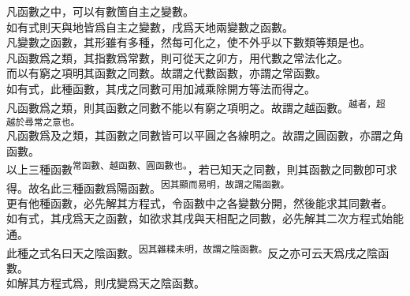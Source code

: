 \begin{enumerate} [label={第\chinese*款},nolistsep]
	凡函數之中，可以有數箇自主之變數。\\
	如有式\CJKmove 則天與地皆爲自主之變數，戌爲天地兩變數之函數。\\
	凡變數之函數，其形雖有多種，然每可化之，使不外乎以下數類\CJKmove 等類是也。\\
	凡函數爲\CJKmove 之類，其指數爲常數，則可從天之卯方，用代數之常法化之。\\
	而以有窮之項明其函數之同數。故謂之代數函數，亦謂之常函數。\\
	如有式\CJKmove，此種函數，其戌之同數可用加減乘除開方等法而得之。\\
	凡函數爲\CJKmove 之類，則其函數之同數不能以有窮之項明之。故謂之越函數。\textsuperscript{越者，超}\\\textsuperscript{越於尋常之意也。}\\
	凡函數爲\CJKmove 及\CJKmove 之類，其函數之同數皆可以平圓之各線明之。故謂之圓函數，亦謂之角函數。\\
	以上三種函數\textsuperscript{常函數、越函數、圓函數也。}，若已知天之同數，則其函數之同數卽可求得。故名此三種函數爲陽函數。\textsuperscript{因其顯而易明，故謂之陽函數。}\\
	更有他種函數，必先解其方程式，令函數中之各變數分開，然後能求其同數者。\\
	如有式\CJKmove，其戌爲天之函數，如欲求其戌與天相配之同數，必先解其二次方程式始能通。\\
	此種之式名曰天之陰函數。\textsuperscript{因其雜糅未明，故謂之陰函數。}反之亦可云天爲戌之陰函數。\\
	如解其方程式爲\CJKmove，則戌變爲天之陰函數。\\

\end{enumerate}
